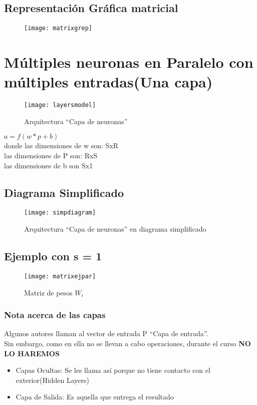 \documentclass{article}
\begin{document}
\subsection{Representación Gráfica matricial}
\begin{figure}[h!]
	\texttt{[image: matrixgrep]}
\end{figure}
\newpage
\section{Múltiples neuronas en Paralelo con múltiples entradas(Una capa)}
\begin{figure}[h!]
	\centering
	\texttt{[image: layersmodel]}
	\caption{Arquitectura  ``Capa de neuronas''}
\end{figure}
$a = f(w*p+b)$\\
donde las dimensiones de w son: SxR\\
las dimensiones de P son: RxS\\
las dimensiones de b son Sx1
\newpage
\subsection{Diagrama Simplificado}
\begin{figure}[h!]
	\centering
	\texttt{[image: simpdiagram]}
	\caption{Arquitectura  ``Capa de neuronas'' en diagrama simplificado}
\end{figure}
\subsection{Ejemplo con s = 1}
\begin{figure}[h!]
	\centering
	\texttt{[image: matrixejpar]}
	\caption{Matriz de pesos $W_i$}
\end{figure}
\subsubsection{Nota acerca de las capas}
Algunos autores llaman al vector de entrada P ``Capa de entrada''.\\
Sin embargo, como en ella no se llevan a cabo operaciones, durante el curso \textbf{NO LO HAREMOS}
\begin{itemize}
	\item Capas Ocultas: Se les llama así porque no tiene contacto con el exterior(Hidden Layers)
	\item Capa de Salida: Es aquella que entrega el resultado
\end{itemize}
\end{document}
